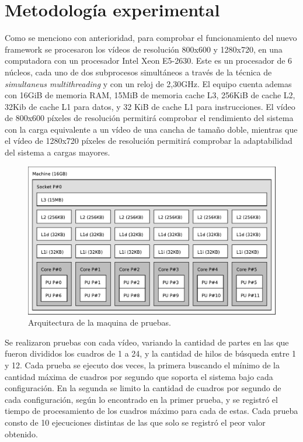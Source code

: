 
\section{Metodología experimental}

Como se menciono con anterioridad, para comprobar el funcionamiento del nuevo
framework se procesaron los vídeos de resolución 800x600 y 1280x720, en una
computadora con un procesador Intel Xeon E5-2630. Este es un procesador de 6
núcleos, cada uno de dos subprocesos simultáneos a través de la técnica de
\emph{simultaneus multithreading} y con un reloj de 2,30GHz. El equipo cuenta
ademas con 16GiB de memoria RAM, 15MiB de memoria cache L3, 256KiB de cache L2,
32Kib de cache L1 para datos, y 32 KiB de cache L1 para instrucciones. El vídeo
de 800x600 píxeles de resolución permitirá comprobar el rendimiento del sistema
con la carga equivalente a un vídeo de una cancha de tamaño doble, mientras que
el vídeo de 1280x720 píxeles de resolución permitirá comprobar la adaptabilidad
del sistema a cargas mayores.

\begin{figure}[!ht]

	\includegraphics[width=\textwidth]{img/topo.pdf}
	\caption{Arquitectura de la maquina de pruebas.}

\end{figure}

Se realizaron pruebas con cada vídeo, variando la cantidad de partes en las que
fueron divididos los cuadros de 1 a 24, y la cantidad de hilos de búsqueda entre
1 y 12. Cada prueba se ejecuto dos veces, la primera buscando el mínimo de la
cantidad máxima de cuadros por segundo que soporta el sistema bajo cada
configuración. En la segunda se limito la cantidad de cuadros por segundo de
cada configuración, según lo encontrado en la primer prueba, y se registró el
tiempo de procesamiento de los cuadros máximo para cada de estas. Cada prueba
consto de 10 ejecuciones distintas de las que solo se registró el peor valor
obtenido.

